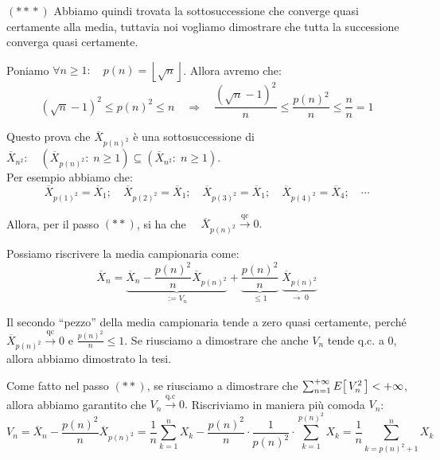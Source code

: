 \begin{dimostrazione}
        \bigskip
        \noindent $(*\!*\!*)$ Abbiamo quindi trovata la sottosuccessione che converge quasi certamente alla media, tuttavia noi vogliamo dimostrare che tutta la successione converga quasi certamente. 
        
        \medskip \noindent Poniamo $\forall n\geq1:\quad p(n) = \left\lfloor \sqrt{n}\right\rfloor$. Allora avremo che:
        \begin{equation}
        \label{eq:dim_leggeforte}
            \left(\sqrt{n}-1\right)^2\leq p(n)^2\leq n \quad \Rightarrow \quad \frac{\left(\sqrt{n}-1\right)^2}{n}\leq \frac{p(n)^2}{n}\leq \frac{n}{n} = 1
        \end{equation}

        Questo prova che $\overline{X}_{p(n)^2}$ è una sottosuccessione di $\overline{X}_{n^2}:\quad \left(\overline{X}_{p(n)^2}:\;n\geq 1\right)\subseteq \left(\overline{X}_{n^2}:\;n\geq 1\right)$.\\
        Per esempio abbiamo che: 
        \[\overline{X}_{p(1)^2} = \overline{X}_{1};\quad \overline{X}_{p(2)^2} = \overline{X}_{1};\quad \overline{X}_{p(3)^2} = \overline{X}_{1};\quad  \overline{X}_{p(4)^2} = \overline{X}_{4};\quad \cdots\]

        Allora, per il passo $(**)$, si ha che $\quad \overline{X}_{p(n)^2}\overset{\text{qc}}{\longrightarrow} 0.$

        \medskip
        Possiamo riscrivere la media campionaria come: 
        \[\overline{X}_n = \underbrace{\overline{X}_n - \frac{p(n)^2}{n}\overline{X}_{p(n)^2}}_{:= V_n} + \underbrace{\frac{p(n)^2}{n}}_{\leq 1} \;\underbrace{\overline{X}_{p(n)^2}}_{\to\;0}\]

        Il secondo ``pezzo'' della media campionaria tende a zero quasi certamente, perché $\overline{X}_{p(n)^2}\overset{\text{qc}}{\longrightarrow}0$ e $\frac{p(n)^2}{n}\leq 1$. Se riusciamo a dimostrare che anche $V_n$ tende q.c. a 0, allora abbiamo dimostrato la tesi.

        \medskip
        Come fatto nel passo $(**)$, se riusciamo a dimostrare che $\sum_{n=1}^{+\infty} E\!\left[\,V_n^2\,\right]<+\infty$, allora abbiamo garantito che $V_n\overset{\text{q.c}}{\longrightarrow} 0.$ Riscriviamo in maniera più comoda $V_n$:
        \[V_n = \overline{X}_n - \frac{p(n)^2}{n}\overline{X}_{p(n)^2} = \frac{1}{n}\sum_{k=1}^n X_k - \frac{p(n)^2}{n}\cdot \frac{1}{p(n)^2}\cdot \sum_{k=1}^{p(n)^2}X_k = \frac{1}{n}\sum_{k = p(n)^2 + 1}^n X_k\]


\end{dimostrazione}
